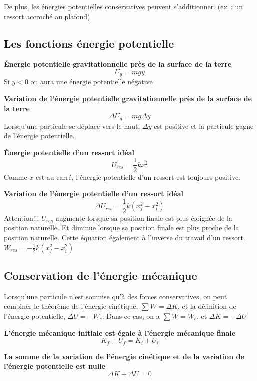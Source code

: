 \documentclass{article}
\begin{document}
De plus, les énergies potentielles conservatives peuvent s'additionner. (ex : un ressort accroché au plafond)

\subsection{Les fonctions énergie potentielle}
\textbf{Énergie potentielle gravitationnelle près de la surface de la terre}
\[U_g = mgy\]
Si $y < 0$ on aura une énergie potentielle négative
\newline

\noindent
\textbf{Variation de l'énergie potentielle gravitationnelle près de la surface de la terre}
\[\Delta U_g = mg\Delta y\]
Lorsqu'une particule se déplace vers le haut, $\Delta y$ est positive et la particule gagne de l'énergie potentielle.
\newline

\noindent
\textbf{Énergie potentielle d'un ressort idéal}
\[U_{res} = \frac{1}{2}kx^2\]
Comme $x$ est au carré, l'énergie potentielle d'un ressort est toujours positive.
\newline

\noindent
\textbf{Variation de l'énergie potentielle d'un ressort idéal}
\[\Delta U_{res} = \frac{1}{2}k(x^2_f - x^2_i)\]
Attention!!! $U_{res}$ augmente lorsque sa position finale est plus éloignée de la position naturelle. Et diminue lorsque sa position finale est plus proche de la position naturelle. Cette équation également à l'inverse du travail d'un ressort. $W_{res} = -\frac{1}{2}k(x^2_f - x^2_i)$

\subsection{Conservation de l'énergie mécanique}
Lorsqu'une particule n'est soumise qu'à des forces conservatives, on peut combiner le théorème de l'énergie cinétique, $\sum W = \Delta K$, et la définition de l'énergie potentielle, $\Delta U = -W_c$. Dans ce cas, on a $\sum W = W_c$, et $\Delta K = -\Delta U$
\newline

\noindent
\textbf{L'énergie mécanique initiale est égale à l'énergie mécanique finale}
\[K_f + U_f = K_i + U_i\]
\newline

\noindent
\textbf{La somme de la variation de l'énergie cinétique et de la variation de l'énergie potentielle est nulle}
\[\Delta K + \Delta U = 0\]
\newline
\end{document}

